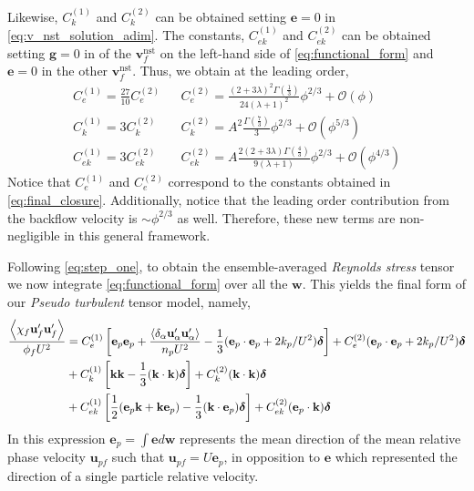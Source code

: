 Likewise, $C^{(1)}_k$ and $C^{(2)}_k$ can be obtained setting $\textbf{e}=0$ in \ref{eq:v_nst_solution_adim}. 
The constants, $C^{(1)}_{ek}$ and $C^{(2)}_{ek}$ can be obtained setting $\textbf{g} = 0$ in of the $\textbf{v}_f^\text{nst}$ on the left-hand side of \ref{eq:functional_form} and $\textbf{e}=0$ in the other $\textbf{v}_f^\text{nst}$. 
Thus, we obtain at the leading order, 
\begin{align}
    C_e^{(1)} =
    \frac{27}{10}
    C_e^{(2)}
    &&  C_e^{(2)} =
    \frac{(2+3\lambda)^2 \Gamma(\frac{1}{3})}{24(\lambda+1)^2}\phi^{2/3}
    + \mathcal{O}(\phi)
    \\
    C_k^{(1)} =
    3
    C_k^{(2)}
    && C_k^{(2)} =
    A^2 \frac{\Gamma(\frac{7}{3})}{3}\phi^{2/3}
    + \mathcal{O}(\phi^{5/3})
    \\
    C_{ek}^{(1)} =
    3
    C_{ek}^{(2)}
    && C_{ek}^{(2)} =
    A\frac{2 (2+3\lambda) \Gamma(\frac{4}{3})}{9(\lambda+1)}\phi^{2/3}
    + \mathcal{O}(\phi^{4/3})
    \label{eq:constants}
\end{align}
Notice that $C_e^{(1)}$ and $C_e^{(2)}$ correspond to the constants obtained in \ref{eq:final_closure}. 
Additionally, notice that the leading order contribution from the backflow velocity is $\sim \phi^{2/3}$ as well. 
Therefore, these new terms are non-negligible in this general framework. 


Following \ref{eq:step_one}, to obtain the ensemble-averaged \textit{Reynolds stress} tensor we now integrate  \ref{eq:functional_form} over all the $\textbf{w}$.
This yields the final form of our \textit{Pseudo turbulent} tensor model, namely, 
\begin{align}
    \frac{\avg{\chi_f \textbf{u}_f'\textbf{u}_f'}}{\phi_f U^2}
    &= 
    C^{(1)}_e \left[
        \textbf{e}_p\textbf{e}_p
        + \frac{\pavg{\textbf{u}_\alpha'\textbf{u}_\alpha'}}{n_p U^2}
         - \frac{1}{3}(\textbf{e}_p\cdot \textbf{e}_p+2k_p/U^2)\bm\delta
    \right]
    + C^{(2)}_e 
    (\textbf{e}_p\cdot \textbf{e}_p+2k_p/U^2)\bm\delta \nonumber \\
    &+ C^{(1)}_k  \left[
        \textbf{kk}
         - \frac{1}{3}(\textbf{k}\cdot \textbf{k})\bm\delta
    \right]
    +C^{(2)}_k 
    (\textbf{k}\cdot \textbf{k})\bm\delta \nonumber \\
    &+ C^{(1)}_{ek} \left[
        \frac{1}{2}
        (\textbf{e}_p\textbf{k}  + \textbf{k} \textbf{e}_p)
         - \frac{1}{3}(\textbf{k}\cdot \textbf{e}_p)\bm\delta
    \right]
    + C^{(2)}_{ek}
    (\textbf{e}_p\cdot \textbf{k})\bm\delta 
    \label{eq:functional_form_avg}
\end{align}
In this expression $\textbf{e}_p = \int \textbf{e} d\textbf{w} $ represents the mean direction of the mean relative phase velocity $\textbf{u}_{pf}$ such that $\textbf{u}_{pf} = U \textbf{e}_p$, in opposition to $\textbf{e}$ which represented the direction of a single particle relative velocity. 



